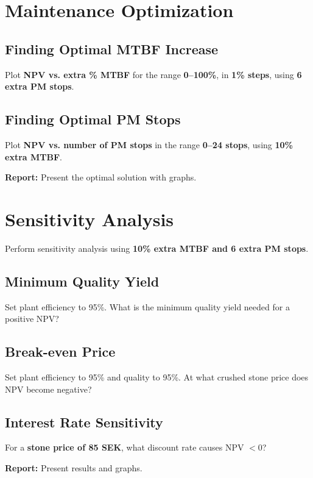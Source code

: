 \documentclass[a4paper,12pt]{exam}
\begin{document}
\section{Maintenance Optimization}
\subsection{Finding Optimal MTBF Increase}
Plot \textbf{NPV vs. extra \% MTBF} for the range \textbf{0–100\%}, in \textbf{1\% steps}, using \textbf{6 extra PM stops}.

\subsection{Finding Optimal PM Stops}
Plot \textbf{NPV vs. number of PM stops} in the range \textbf{0–24 stops}, using \textbf{10\% extra MTBF}.

\textbf{Report:} Present the optimal solution with graphs.

\section{Sensitivity Analysis}
Perform sensitivity analysis using \textbf{10\% extra MTBF and 6 extra PM stops}.

\subsection{Minimum Quality Yield}
Set plant efficiency to 95\%. What is the minimum quality yield needed for a positive NPV? 

\subsection{Break-even Price}
Set plant efficiency to 95\% and quality to 95\%. At what crushed stone price does NPV become negative?

\subsection{Interest Rate Sensitivity}
For a \textbf{stone price of 85 SEK}, what discount rate causes NPV $<0$?

\textbf{Report:} Present results and graphs.
\end{document}
